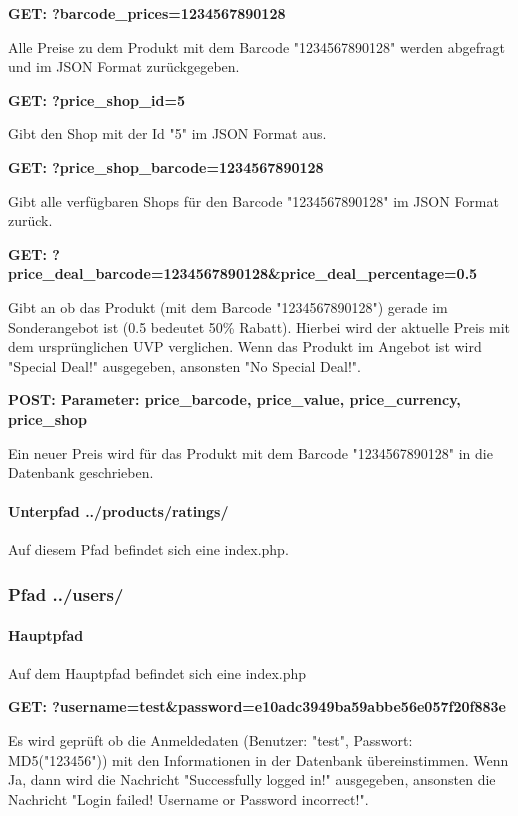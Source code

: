 \documentclass{scrartcl}
\begin{document}
\noindent \textbf{GET: ?barcode\_prices=1234567890128}

\noindent Alle Preise zu dem Produkt mit dem Barcode "1234567890128" werden abgefragt und im JSON Format zurückgegeben. \newline 

\noindent \textbf{GET: ?price\_shop\_id=5}

\noindent Gibt den Shop mit der Id "5" im JSON Format aus. \newline

\noindent \textbf{GET: ?price\_shop\_barcode=1234567890128}

\noindent Gibt alle verfügbaren Shops für den Barcode "1234567890128" im JSON Format zurück. \newline

\noindent \textbf{GET: ?price\_deal\_barcode=1234567890128\&price\_deal\_percentage=0.5}

\noindent Gibt an ob das Produkt (mit dem Barcode "1234567890128") gerade im Sonderangebot ist (0.5 bedeutet 50\% Rabatt). Hierbei wird der aktuelle Preis mit dem ursprünglichen UVP verglichen. Wenn das Produkt im Angebot ist wird "Special Deal!" ausgegeben, ansonsten "No Special Deal!". \newline

\noindent \textbf{POST: Parameter: price\_barcode, price\_value, price\_currency, price\_shop}

\noindent Ein neuer Preis wird für das Produkt mit dem Barcode "1234567890128" in die Datenbank geschrieben.

\paragraph{Unterpfad ../products/ratings/}
Auf diesem Pfad befindet sich eine index.php.

\subsubsection{Pfad ../users/}

\paragraph{Hauptpfad} 
Auf dem Hauptpfad befindet sich eine index.php \newline 

\noindent \textbf{GET: ?username=test\&password=e10adc3949ba59abbe56e057f20f883e}

\noindent Es wird geprüft ob die Anmeldedaten (Benutzer: "test", Passwort: MD5("123456")) mit den Informationen in der Datenbank übereinstimmen. Wenn Ja, dann wird die Nachricht "Successfully logged in!" ausgegeben, ansonsten die Nachricht "Login failed! Username or Password incorrect!". \newline
\end{document}
